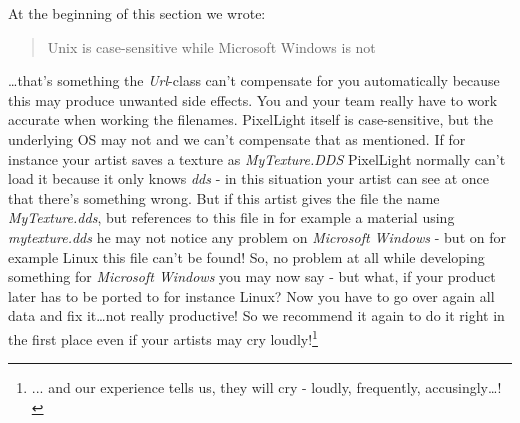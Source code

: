 At the beginning of this section we wrote: \begin{quote}Unix is case-sensitive while Microsoft Windows is not\end{quote}\ldots that's something the \emph{Url}-class can't compensate for you automatically because this may produce unwanted side effects. You and your team really have to work accurate when working the filenames. PixelLight itself is case-sensitive, but the underlying OS may not and we can't compensate that as mentioned. If for instance your artist saves a texture as \emph{MyTexture.DDS} PixelLight normally can't load it because it only knows \emph{dds} - in this situation your artist can see at once that there's something wrong. But if this artist gives the file the name \emph{MyTexture.dds}, but references to this file in for example a material using \emph{mytexture.dds} he may not notice any problem on \emph{Microsoft Windows} - but on for example Linux this file can't be found! So, no problem at all while developing something for \emph{Microsoft Windows} you may now say - but what, if your product later has to be ported to for instance Linux? Now you have to go over again all data and fix it\ldots not really productive! So we recommend it again to do it right in the first place even if your artists may cry loudly!\footnote{... and our experience tells us, they will cry - loudly, frequently, accusingly\ldots !}
